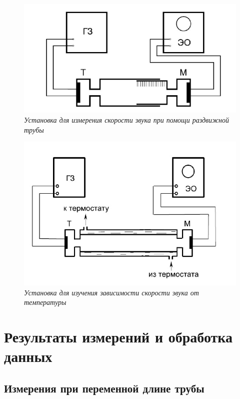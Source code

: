 \documentclass[12pt,a4paper]{article}
\begin{document}
\begin{figure}[H]
	\begin{center}
		\includegraphics[width=12cm]{2.1.3_1}
	\end{center}
	\caption{\textit{Установка для измерения скорости звука при помощи раздвижной трубы}}
	\label{img1}
\end{figure}

\begin{figure}[H]
	\begin{center}
		\includegraphics[width=12cm]{2.1.3_2}
	\end{center}
	\caption{\textit{Установка для изучения зависимости скорости звука от температуры}}
	\label{img2}
\end{figure}

\newpage

\section{Результаты измерений и обработка данных}

\subsection{Измерения при переменной длине трубы}
\end{document}
